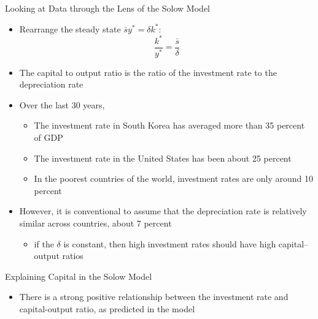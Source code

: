 \documentclass[aspectratio=1610]{beamer}
\begin{document}
\begin{frame}[wide]{Looking at Data through the Lens of the Solow Model}
	\begin{itemize}
			\item Rearrange the steady state $\bar{s}y^* = \delta k^*$:
			\[\frac{k^*}{y^*} = \frac{\bar{s}}{\delta}\]
			\item The capital to output ratio is the ratio of the investment rate to the depreciation rate
			\item Over the last 30 years, 
			\begin{itemize}
					\item The investment rate in South Korea has averaged more than 35 percent of GDP
					\item The investment rate in the United States has been about 25 percent
					\item In the poorest countries of the world, investment rates are only around 10 percent
				\end{itemize}
			\item However, it is conventional to assume that the depreciation rate is relatively similar across countries, about 7 percent
			\begin{itemize}
					\item if the $\delta$ is constant, then high investment rates should have high capital–output ratios
				\end{itemize}
		\end{itemize}
\end{frame}

\begin{frame}[wide]{Explaining Capital in the Solow Model}
	\begin{itemize}
			\item There is a strong positive relationship between the investment rate and capital-output ratio, as predicted in the model
		\end{itemize}
	\begin{figure}
			\centering
		\end{figure}
	
\end{frame}
\end{document}
